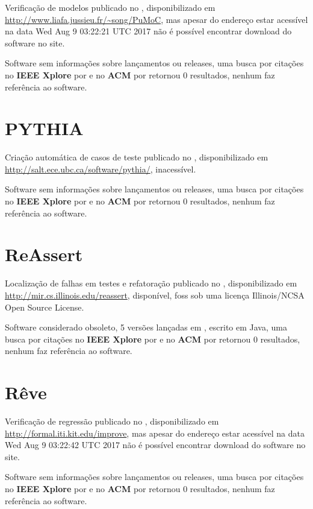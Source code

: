 Verificação de modelos
publicado no  ,
disponibilizado em \url{http://www.liafa.jussieu.fr/~song/PuMoC},
mas apesar do endereço estar acessível na data 
Wed Aug  9 03:22:21 UTC 2017
não é possível encontrar download do software no site.

Software sem informações sobre lançamentos ou releases,
uma busca por citações no {\bf IEEE Xplore} por
\texttt{}
e no {\bf ACM} por
\texttt{}
retornou
0 resultados,
nenhum faz referência ao software.



\section{PYTHIA}

Criação automática de casos de teste
publicado no  ,
disponibilizado em \url{http://salt.ece.ubc.ca/software/pythia/},
inacessível.

Software sem informações sobre lançamentos ou releases,
uma busca por citações no {\bf IEEE Xplore} por
\texttt{}
e no {\bf ACM} por
\texttt{}
retornou
0 resultados,
nenhum faz referência ao software.



\section{ReAssert}

Localização de falhas em testes e refatoração
publicado no  ,
disponibilizado em \url{http://mir.cs.illinois.edu/reassert},
disponível,
foss
sob uma licença Illinois/NCSA Open Source License.

Software considerado obsoleto,
5 versões lançadas
em ,
escrito em Java,
uma busca por citações no {\bf IEEE Xplore} por
\texttt{}
e no {\bf ACM} por
\texttt{}
retornou
0 resultados,
nenhum faz referência ao software.



\section{Rêve}

Verificação de regressão
publicado no  ,
disponibilizado em \url{http://formal.iti.kit.edu/improve},
mas apesar do endereço estar acessível na data 
Wed Aug  9 03:22:42 UTC 2017
não é possível encontrar download do software no site.

Software sem informações sobre lançamentos ou releases,
uma busca por citações no {\bf IEEE Xplore} por
\texttt{}
e no {\bf ACM} por
\texttt{}
retornou
0 resultados,
nenhum faz referência ao software.



